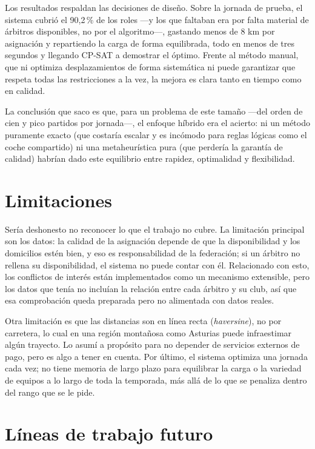 \documentclass[11pt,a4paper,spanish]{book}
\numberwithin{equation}{chapter}
\numberwithin{figure}{chapter}
\numberwithin{table}{chapter}
\begin{document}
Los resultados respaldan las decisiones de diseño. Sobre la jornada de prueba, el sistema cubrió el 90,2\,\% de los roles —y los que faltaban era por falta material de árbitros disponibles, no por el algoritmo—, gastando menos de 8 km por asignación y repartiendo la carga de forma equilibrada, todo en menos de tres segundos y llegando CP-SAT a demostrar el óptimo. Frente al método manual, que ni optimiza desplazamientos de forma sistemática ni puede garantizar que respeta todas las restricciones a la vez, la mejora es clara tanto en tiempo como en calidad.

La conclusión que saco es que, para un problema de este tamaño —del orden de cien y pico partidos por jornada—, el enfoque híbrido era el acierto: ni un método puramente exacto (que costaría escalar y es incómodo para reglas lógicas como el coche compartido) ni una metaheurística pura (que perdería la garantía de calidad) habrían dado este equilibrio entre rapidez, optimalidad y flexibilidad.

\section{Limitaciones}

Sería deshonesto no reconocer lo que el trabajo no cubre. La limitación principal son los datos: la calidad de la asignación depende de que la disponibilidad y los domicilios estén bien, y eso es responsabilidad de la federación; si un árbitro no rellena su disponibilidad, el sistema no puede contar con él. Relacionado con esto, los conflictos de interés están implementados como un mecanismo extensible, pero los datos que tenía no incluían la relación entre cada árbitro y su club, así que esa comprobación queda preparada pero no alimentada con datos reales.

Otra limitación es que las distancias son en línea recta (\emph{haversine}), no por carretera, lo cual en una región montañosa como Asturias puede infraestimar algún trayecto. Lo asumí a propósito para no depender de servicios externos de pago, pero es algo a tener en cuenta. Por último, el sistema optimiza una jornada cada vez; no tiene memoria de largo plazo para equilibrar la carga o la variedad de equipos a lo largo de toda la temporada, más allá de lo que se penaliza dentro del rango que se le pide.

\section{Líneas de trabajo futuro}
\end{document}
